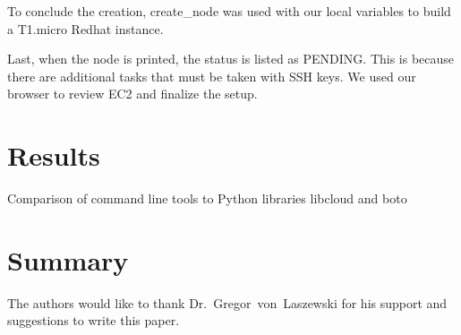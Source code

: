 
To conclude the creation, create\_node was used with our local variables to build a 
T1.micro Redhat instance.


Last, when the node is printed, the status is listed as PENDING. This
is because there are additional tasks that must be taken with SSH keys. We 
used our browser to review EC2 and finalize the setup.


 
\section{Results}

Comparison of command line tools to Python libraries libcloud and boto

\section{Summary}

\begin{acks}

  The authors would like to thank Dr.~Gregor~von~Laszewski for his
  support and suggestions to write this paper.

\end{acks}


 

